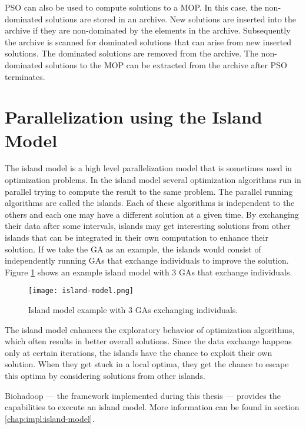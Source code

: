 PSO can also be used to compute solutions to a MOP. In this case, the non-dominated solutions are stored in an archive. New solutions are inserted into the archive if they are non-dominated by the elements in the archive. Subsequently the archive is scanned for dominated solutions that can arise from new inserted solutions. The dominated solutions are removed from the archive. The non-dominated solutions to the MOP can be extracted from the archive after PSO terminates.

\section{Parallelization using the Island Model}
\label{chap:bioalgorithms:island-model}
The island model is a high level parallelization model that is sometimes used in optimization problems. In the island model several optimization algorithms run in parallel trying to compute the result to the same problem. The parallel running algorithms are called the islands. Each of these algorithms is independent to the others and each one may have a different solution at a given time. By exchanging their data after some intervals, islands may get interesting solutions from other islands that can be integrated in their own computation to enhance their solution. If we take the GA as an example, the islands would consist of independently running GAs that exchange individuals to improve the solution. Figure \ref{fig:island-model} shows an example island model with 3 GAs that exchange individuals.

\begin{figure}
  \centering
  \texttt{[image: island-model.png]}
  \caption[Island model example]{Island model example with 3 GAs exchanging individuals.}
  \label{fig:island-model}
\end{figure}

The island model enhances the exploratory behavior of optimization algorithms, which often results in better overall solutions. Since the data exchange happens only at certain iterations, the islands have the chance to exploit their own solution. When they get stuck in a local optima, they get the chance to escape this optima by considering solutions from other islands.

Biohadoop --- the framework implemented during this thesis --- provides the capabilities to execute an island model. More information can be found in section \ref{chap:impl:island-model}.

